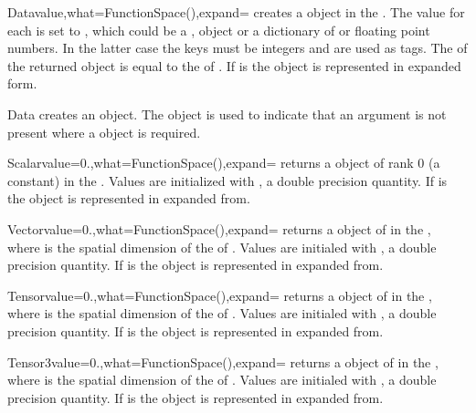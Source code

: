 \begin{classdesc}{Data}{value,what=FunctionSpace(),expand=\False}
creates a \Data object in the \FunctionSpace {}. 
The value for each \DataSamplePoints is set to , which could be a \numpy, \Data object  or a dictionary of 
\numpy or floating point numbers. In the latter case the keys must be integers and are used
as tags.
The \Shape of the returned object is equal to the \Shape of . If  is \True
the \Data object is represented in expanded form.
\end{classdesc}

\begin{classdesc}{Data}{}
creates an \EmptyData object. The \EmptyData object is used to indicate that an argument is not present
where a \Data object is required.
\end{classdesc}

\begin{funcdesc}{Scalar}{value=0.,what=FunctionSpace(),expand=\False}
returns a \Data object of rank 0 (a constant) in the \FunctionSpace {}.
Values are initialized with , a double precision quantity. If  is \True
the \Data object is represented in expanded from.
\end{funcdesc}

\begin{funcdesc}{Vector}{value=0.,what=FunctionSpace(),expand=\False}
returns a \Data object of \Shape {} in the \FunctionSpace {},
where  is the spatial dimension of the \Domain of .
Values are initialed with , a double precision quantity. If  is \True
the \Data object is represented in expanded from.
\end{funcdesc}

\begin{funcdesc}{Tensor}{value=0.,what=FunctionSpace(),expand=\False}
returns a \Data object of \Shape {} in the \FunctionSpace {},
where  is the spatial dimension of the \Domain of .
Values are initialed with , a double precision quantity. If  is \True
the \Data object is represented in expanded from.
\end{funcdesc}

\begin{funcdesc}{Tensor3}{value=0.,what=FunctionSpace(),expand=\False}
returns a \Data object of \Shape {} in the \FunctionSpace {},
where  is the spatial dimension of the \Domain of .
Values are initialed with , a double precision quantity. If  is \True
the \Data object is represented in expanded from.
\end{funcdesc}

